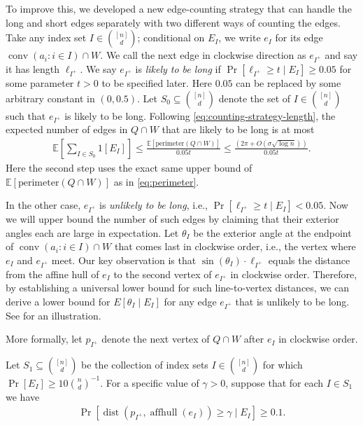 \documentclass{article}\usepackage[a4paper,margin=20mm]{geometry}
\newcommand{\E}{\mathbb E}
\newcommand{\aff}{\operatorname{affhull}}
\newcommand{\conv}{\operatorname{conv}}
\newcommand{\dist}{\operatorname{dist}}
\begin{document}
To improve this, we developed a new edge-counting strategy that can handle the long and short edges separately with two different ways of counting the edges. 
Take any index set $I \in \binom{[n]}{d}$; conditional on $E_I$, we write $e_I$ for its edge $\conv(a_i : i \in I) \cap W$.
We call the next edge in clockwise direction as $e_{I^+}$ and say it has length $\ell_{I^+}$.
We say $e_{I^+}$ is \emph{likely to be long} if $\Pr[\ell_{I^+} \geq t \mid E_I] \geq 0.05$ for some parameter $t > 0$ to be specified later. Here $0.05$ can be replaced by some arbitrary constant in $(0, 0.5)$.
Let $S_0 \subseteq \binom{[n]}{d}$ denote the set of $I \in \binom{[n]}{d}$ such that $e_{I^+}$ is likely to be long.
Following \eqref{eq:counting-strategy-length}, the expected number of edges in $Q \cap W$ that are likely to be long is at most
\begin{align}
    \E[\sum_{I \in S_0} 1[E_I]] \leq \frac{\E[\mathrm{perimeter}(Q \cap W)]}{0.05 t} \leq \frac{(2\pi + O(\sigma \sqrt{\log n}))}{0.05 t}.
    \label{eq:ub-long-edges}
\end{align}
Here the second step uses the exact same upper bound of $\E[\mathrm{perimeter}(Q \cap W)]$ as in \eqref{eq:perimeter}.

In the other case, $e_{I^+}$ is \emph{unlikely to be long}, i.e., $\Pr[\ell_{I^+} \geq t \mid E_I] < 0.05$. 
Now we will upper bound the number of such edges by claiming that their exterior angles each are large in expectation.
Let $\theta_I$ be the exterior angle at the endpoint of $\conv(a_i : i\in I)\cap W$ that comes last in clockwise order, i.e.,
the vertex where $e_I$ and $e_{I^+}$ meet.
% 
Our key observation is that $\sin(\theta_I) \cdot \ell_{I^+}$ equals the distance from the affine hull of $e_I$ to the second vertex of $e_{I^+}$ in clockwise order. Therefore, by establishing a universal lower bound for such line-to-vertex distances, we can derive a lower bound for $E[\theta_I \mid E_I]$ for any edge $e_{I^+}$ that is unlikely to be long.
See  for an illustration.

More formally,
let $p_{I^+}$ denote the next vertex of $Q \cap W$ after $e_I$ in clockwise order.

Let $S_1 \subseteq \binom{[n]}{d}$ be the collection of index sets $I \in \binom{[n]}{d}$ for which $\Pr[E_I] \geq 10 \binom{n}{d}^{-1}$. For a specific value of $\gamma > 0$, suppose that for each $I \in S_1$ we have
\begin{align}
    \Pr[\dist(p_{I^+}, \aff(e_I)) \geq \gamma \mid E_I] \geq 0.1 . \label{eq:gamma}
\end{align}
\end{document}
